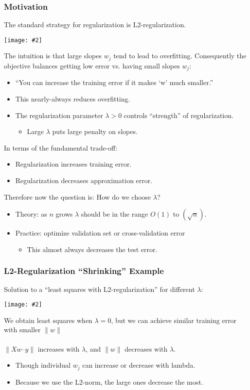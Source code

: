 \documentclass{article}
\def\blu#1{{\color{blu}#1}}
\def\gre#1{{\color{gre}#1}}
\def\red#1{{\color{red}#1}}
\def\norm#1{\|#1\|}
\newcommand{\centerfig}[2]{\begin{center}\texttt{[image: \#2]}\end{center}}
\begin{document}
\subsubsection*{Motivation}

The standard strategy for \blu{regularization} is \blu{L2-regularization}. 
\centerfig{0.75}{L2-reg-1}
The intuition is that \red{large slopes $ w_j $} tend to lead to overfitting. Consequently the objective \gre{balances getting low error vs. having small slopes} $ w_j $:
\begin{itemize}
	\item “You can increase the training error if it makes ‘w’ much smaller.”
	\item This nearly-always reduces overfitting.
	\item The regularization parameter $\lambda > 0$ controls “strength” of regularization. 
	\begin{itemize}
		\item Large $\lambda$ puts large penalty on slopes.
	\end{itemize}
\end{itemize}
In terms of the fundamental trade-off:
\begin{itemize}
	\item Regularization \red{increases training error}.
	\item Regularization \gre{decreases approximation error}.
\end{itemize}
Therefore now the question is: How do we choose $\lambda$?
\begin{itemize}
	\item Theory: as $ n $ grows $\lambda$ should be in the range $ O(1) $ to $ (\sqrt{n}) $.
	\item Practice: optimize \blu{validation set} or \blu{cross-validation error}
	\begin{itemize}
		\item \gre{This almost always decreases the test error.}
	\end{itemize}
\end{itemize}
\subsubsection*{L2-Regularization “Shrinking” Example}
Solution to a “\blu{least squares with L2-regularization}” for \gre{different $\lambda$}:
\centerfig{0.9}{L2-reg-ex1}
We obtain \gre{least squares when $\lambda = 0$}, but we can achieve similar training error with smaller $ \norm{w} $ \\ \\
$ \norm{Xw –y} $ increases with $\lambda$, and $ \norm{w} $ decreases with $\lambda$.
\begin{itemize}
	\item Though individual $ w_j $ can increase or decrease with lambda.
	\item Because we use the L2-norm, the large ones decrease the most.
\end{itemize}
\end{document}
